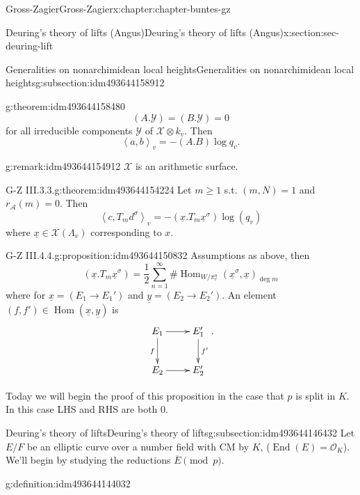 \documentclass[oneside,10pt,]{book}
\numberwithin{equation}{section}
\newcommand{\pair}[2]{\left\langle #1, #2 \right\rangle}
\newcommand{\ints}{\mathcal{O}}
\DeclareMathOperator{\End}{End}
\DeclareMathOperator{\Hom}{Hom}
\begin{document}
\begin{chapterptx}{Gross-Zagier}{}{Gross-Zagier}{}{}{x:chapter:chapter-buntes-gz}
\begin{sectionptx}{Deuring's theory of lifts (Angus)}{}{Deuring's theory of lifts (Angus)}{}{}{x:section:sec-deuring-lift}
\begin{subsectionptx}{Generalities on nonarchimidean local heights}{}{Generalities on nonarchimidean local heights}{}{}{g:subsection:idm493644158912}
\begin{theorem}{}{}{g:theorem:idm493644158480}
\begin{equation*}
(A. \mathcal Y) = (B. \mathcal Y) = 0
\end{equation*}
for all irreducible components \(\mathcal Y\) of \(\mathcal X\otimes k_v\). Then%
\begin{equation*}
\pair ab_v = -(A.B) \log q_v\text{.}
\end{equation*}
%
\end{theorem}
\begin{remark}{}{g:remark:idm493644154912}%
\(\mathcal X\) is an arithmetic surface.%
\end{remark}
\begin{theorem}{G-Z III.3.3.}{}{g:theorem:idm493644154224}%
Let \(m \ge 1\) s.t. \((m,N) = 1\) and \(r_{\mathscr A}(m)= 0\). Then%
\begin{equation*}
\pair c{T_m d^\sigma }_v = -(\underline x. T_m \underline x^\sigma ) \log(q_v)
\end{equation*}
where \(\underline x \in \mathcal X(\Lambda _v)\) corresponding to \(x\).%
\end{theorem}
\begin{proposition}{G-Z III.4.4.}{}{g:proposition:idm493644150832}%
Assumptions as  above, then%
\begin{equation*}
(\underline x. T_m \underline x^\sigma ) = \frac12 \sum_{n=1}^\infty  \#\Hom_{W/\pi _v^n}(\underline x^\sigma , \underline x)_{\deg m}
\end{equation*}
where for \(\underline x = (E_1 \to E_1')\) and \(\underline y = (E_2 \to E_2')\). An element \((f,f') \in \Hom(\underline x,\underline y) \) is%
\begin{equation*}
\xymatrix{
E_1 \ar[r] \ar[d]_{f} & E_1' \ar[d]^{f'}\\
E_2 \ar[r] & E_2'}\text{.}
\end{equation*}
%
\end{proposition}
Today we will begin the proof of this proposition in the case that \(p\) is split in \(K\). In this case LHS and RHS are both 0.%
\end{subsectionptx}
%
%
\typeout{************************************************}
\typeout{************************************************}
%
\begin{subsectionptx}{Deuring's theory of lifts}{}{Deuring's theory of lifts}{}{}{g:subsection:idm493644146432}
Let \(E/F\) be an elliptic curve over a number field with CM by \(K\), (\(\End (E) = \ints_K\)). We'll begin by studying the reductions \(\overline E \pmod p\).%
\begin{definition}{}{g:definition:idm493644144032}%

\end{definition}
\end{subsectionptx}
\end{sectionptx}
\end{chapterptx}
\end{document}
